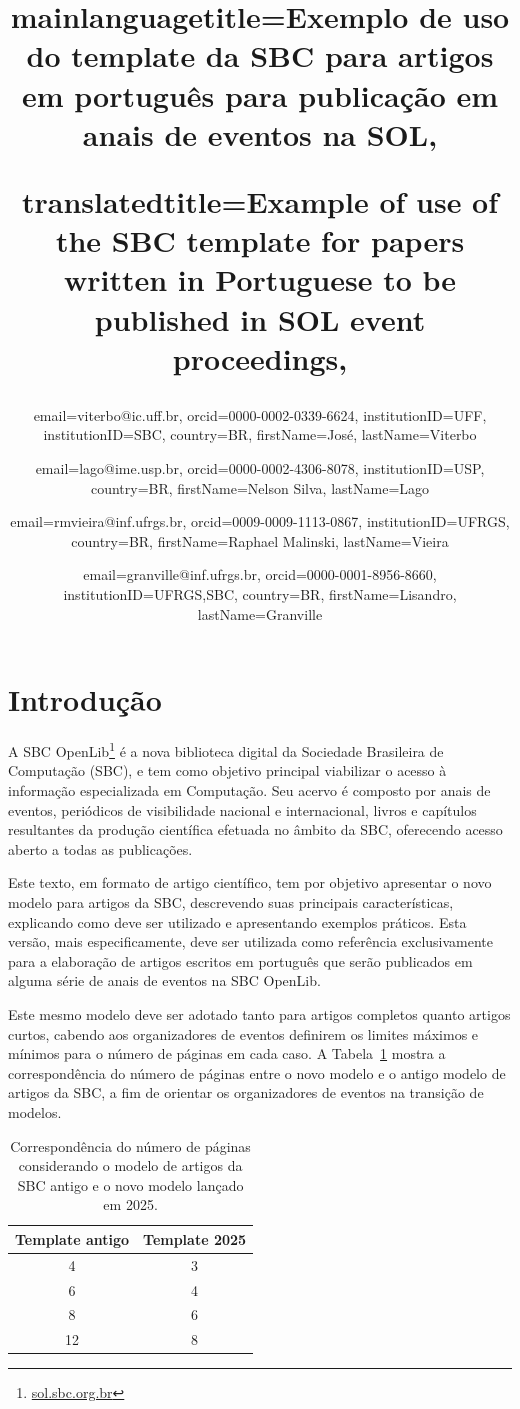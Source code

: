 \documentclass[portuguese,notblind]{sbc20}
\title
  {
    mainlanguagetitle={Exemplo de uso do template da SBC para artigos em português para publicação em anais de eventos na SOL},

    translatedtitle={Example of use of the SBC template for papers written in Portuguese to be published in SOL event proceedings},
  }
\author
  {
    email=viterbo@ic.uff.br,
    orcid=0000-0002-0339-6624, 
    institutionID=UFF,
    institutionID=SBC,
    country=BR,
    firstName=José,
    lastName=Viterbo 
  }
\author
  {
    email=lago@ime.usp.br,
    orcid=0000-0002-4306-8078,
    institutionID={USP},
    country=BR,
    firstName={Nelson Silva},
    lastName=Lago
  }
\author
  {
    email=rmvieira@inf.ufrgs.br,
    orcid=0009-0009-1113-0867,
    institutionID={UFRGS},
    country=BR,
    firstName={Raphael Malinski},
    lastName=Vieira
  }
\author
  {
    email=granville@inf.ufrgs.br,
    orcid=0000-0001-8956-8660,
    institutionID={UFRGS,SBC},
    country=BR,
    firstName=Lisandro,
    lastName=Granville
  }
\begin{document}
\maketitle

\section{Introdução}
\label{sec:intro}

A SBC OpenLib\footnote{\url{sol.sbc.org.br}} é a nova biblioteca digital da Sociedade Brasileira de Computação (SBC), e tem como objetivo principal viabilizar o acesso à informação especializada em Computação. Seu acervo é composto por anais de eventos, periódicos de visibilidade nacional e internacional, livros e capítulos resultantes da produção científica efetuada no âmbito da SBC, oferecendo acesso aberto a todas as publicações.

Este texto, em formato de artigo científico, tem por objetivo apresentar o novo modelo para artigos da SBC, descrevendo suas principais características, explicando como deve ser utilizado e apresentando exemplos práticos. Esta versão, mais especificamente, deve ser utilizada como referência exclusivamente para a elaboração de artigos escritos em português que serão publicados em alguma série de anais de eventos na SBC OpenLib.

Este mesmo modelo deve ser adotado tanto para artigos completos quanto artigos curtos, cabendo aos organizadores de eventos definirem os limites máximos e mínimos para o número de páginas em cada caso. A Tabela~\ref{tab:equivalence} mostra a correspondência do número de páginas entre o novo modelo e o antigo modelo de artigos da SBC, a fim de orientar os organizadores de eventos na transição de modelos. 

\begin{table}[!hb]
\centering
\begin{tabular}{@{}cc@{}}
\toprule
Template antigo & Template 2025 \\
\midrule
 4  & 3 \\
 6  & 4 \\
 8  & 6 \\
 12  & 8 \\
\bottomrule
\end{tabular}
\caption{Correspondência do número de páginas considerando o modelo de artigos da SBC antigo e o novo modelo lançado em 2025.\label{tab:equivalence}}
\end{table}
\end{document}
